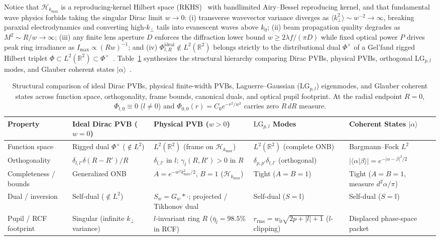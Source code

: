 \documentclass[aps,pra,onecolumn,notitlepage,11pt,tightenlines,amsmath,amssymb,floatfix,longbibliography]{revtex4-2}
\providecommand{\ket}[1]{\lvert#1\rangle}
\providecommand{\braket}[2]{\langle#1\vert#2\rangle}
\providecommand{\abs}[1]{\lvert#1\rvert}
\begin{document}
Notice that $\mathcal{H}_{k_{\max}}$ is a reproducing-kernel Hilbert space (RKHS)~\cite{PaulsenRaghupathi2016} with bandlimited Airy--Bessel reproducing kernel, and that fundamental wave physics forbids taking the singular Dirac limit $w \to 0$: (i) transverse wavevector variance diverges as $\langle k_\perp^2 \rangle \sim w^{-2} \to \infty$, breaking paraxial electrodynamics and converting high-$k_\perp$ tails into evanescent waves above $k_0$; (ii) beam propagation quality degrades as $M^2 \sim R/w \to \infty$; (iii) any finite lens aperture $D$ enforces the diffraction lower bound $w \ge 2\lambda f/(\pi D)$ while fixed optical power $P$ drives peak ring irradiance as $I_{\max} \propto (R w)^{-1}$; and (iv) $\Phi_{l,R}^{\mathrm{ideal}} \notin L^2(\mathbb{R}^2)$ belongs strictly to the distributional dual $\Phi^\times$ of a Gel'fand rigged Hilbert triplet $\Phi \subset L^2(\mathbb{R}^2) \subset \Phi^\times$~\cite{Gelfand1964}. Table~\ref{tab:frame_comparison} synthesizes the structural hierarchy comparing Dirac PVBs, physical PVBs, orthogonal $\mathrm{LG}_{p,l}$ modes, and Glauber coherent states $\ket{\alpha}$~\cite{Klauder1985,Perelomov1986,Gazeau2009}.

\begin{table}[t]
\caption{Structural comparison of ideal Dirac PVBs, physical finite-width PVBs, Laguerre--Gaussian ($\mathrm{LG}_{p,l}$) eigenmodes, and Glauber coherent states across function space, orthogonality, frame bounds, canonical duals, and optical pupil footprint. At the radial endpoint $R = 0$, $\Phi_{l,0} \equiv 0$ ($l \neq 0$) and $\Phi_{0,0}(r) = C_0 e^{-r^2/w^2}$ carries zero $R\,dR$ measure.}
\label{tab:frame_comparison}
\begin{ruledtabular}
\footnotesize
\begin{tabular}{p{2.2cm}p{3.6cm}p{4.3cm}p{3.2cm}p{3.3cm}}
Property & Ideal Dirac PVB ($w=0$) & Physical PVB ($w>0$) & $\mathrm{LG}_{p,l}$ Modes & Coherent States $\ket{\alpha}$ \\
\hline
Function space & Rigged dual $\Phi^\times$ ($\notin L^2$) & $L^2(\mathbb{R}^2)$ (frame on $\mathcal{H}_{k_{\max}}$) & $L^2(\mathbb{R}^2)$ (complete ONB) & Bargmann--Fock $L^2$ \\
Orthogonality & $\delta_{l,l'}\delta(R-R')/R$ & $\delta_{l,l'}$ in $l$; $\gamma_l(R,R') > 0$ in $R$ & $\delta_{p,p'}\delta_{l,l'}$ (orthogonal) & $\abs{\braket{\alpha}{\beta}} = e^{-\abs{\alpha-\beta}^2/2}$ \\
Completeness / bounds & Generalized ONB & $A = e^{-w^2 k_{\max}^2/2},\, B = 1$ ($\mathcal{H}_{k_{\max}}$) & Tight ($A = B = 1$) & Tight ($A = B = 1$, measure $d^2\alpha/\pi$) \\
Dual / inversion & Self-dual ($\notin L^2$) & $S_w = G_w * \cdot$; projected / Tikhonov dual & Self-dual ($S = \mathbb{I}$) & Self-dual ($S = \mathbb{I}$) \\
Pupil / RCF footprint & Singular (infinite $k_\perp$ variance) & $l$-invariant ring $R$ ($\bar{\eta}_l = 98.5\%$ in RCF) & $r_{\mathrm{rms}} = w_0\sqrt{2p+\abs{l}+1}$ ($l$-clipping) & Displaced phase-space packet \\
\end{tabular}
\end{ruledtabular}
\end{table}
\end{document}
